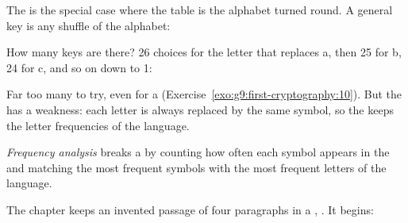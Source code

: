 The  is the special case where the table is the alphabet turned
round. A general key is any shuffle of the alphabet:

\label{lst:g9:first-cryptography:substitution}

\label{out:g9:first-cryptography:substitution}

How many keys are there? 26 choices for the letter that replaces a, then 25 for
b, 24 for c, and so on down to 1:

\label{lst:g9:first-cryptography:count}

\label{out:g9:first-cryptography:count}

Far too many to try, even for a 
(Exercise~\ref{exo:g9:first-cryptography:10}). But the  has a weakness:
each letter is always replaced by the same symbol, so the  keeps the
letter frequencies of the language.

\begin{definition}\label{def:g9:first-cryptography:frequency-analysis}
\emph{Frequency analysis} breaks a 
by counting how often each symbol appears in the  and matching the
most frequent symbols with the most frequent letters of the language.
\end{definition}

The chapter keeps an invented passage of four paragraphs in a ,
. It begins:

\label{lst:g9:first-cryptography:passage}

